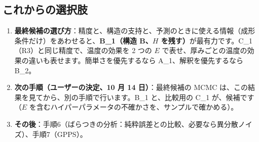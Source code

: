 \documentclass[paper=a4paper,fontsize=10.5pt,line_length=44zw,number_of_lines=38]{jlreq}
\begin{document}
\subsection{これからの選択肢}
\begin{enumerate}[itemsep=0.6ex,topsep=0.6ex]
\item \textbf{最終候補の選び方}：精度と、構造の支持と、予測のときに使える情報（成形条件だけ）をあわせると、\textbf{B\_1（構造 B、$H$ を残す）}が最有力です。C\_1（R3）と同じ精度で、温度の効果を 2 つの $E$ で表せ、厚みごとの温度の効果の違いも表せます。簡単さを優先するなら A\_1、解釈を優先するなら B\_2。
\item \textbf{次の手順（ユーザーの決定、10 月 14 日）}：最終候補の MCMC は、この結果を見てから、別の手順で行います。B\_1 と、比較用の C\_1 が、候補です（$E$ を含むハイパーパラメータの不確かさを、サンプルで確かめる）。
\item \textbf{その後}：手順6（ばらつきの分析：純粋誤差との比較、必要なら異分散ノイズ）、手順7（GPPS）。
\end{enumerate}
\end{document}
